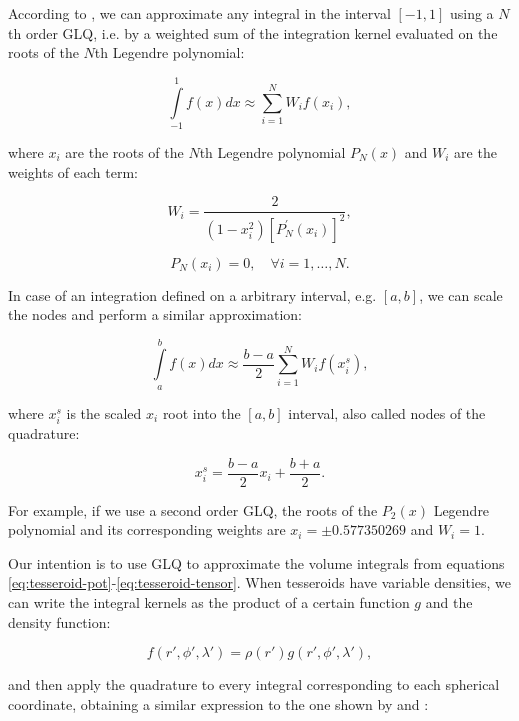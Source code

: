 \documentclass[extra]{gji}
\begin{document}
According to \citet[p.~390]{Hildebrand1987}, we can approximate any 
integral in the interval $[-1, 1]$ using a $N$th order GLQ, i.e. by a 
weighted sum of the integration kernel evaluated on the roots of the 
$N$th Legendre polynomial:

\begin{equation}
    \int\limits_{-1}^1 f(x) dx \approx \sum_{i=1}^N W_i f(x_i),
\end{equation}

\noindent where $x_i$ are the roots of the $N$th Legendre polynomial 
$P_N(x)$ and $W_i$ are the weights of each term:

\begin{equation}
    W_i = \frac{2}{(1-x_i^2)[P_N^\prime(x_i)]^2},
\end{equation}

\begin{equation}
    P_N(x_i) = 0, \quad \forall i = {1,\dots,N}.
\end{equation}

In case of an integration defined on a arbitrary interval, e.g. 
$[a,b]$, we can scale the nodes and perform a similar approximation:

\begin{equation}
    \int\limits_a^b f(x) dx \approx \frac{b-a}{2} \sum_{i=1}^N W_i f(x_i^s),
\label{eq:glq-scaled}
\end{equation}

\noindent where $x_i^s$ is the scaled $x_i$ root into the $[a,b]$ 
interval, also called nodes of the quadrature:

\begin{equation}
    x_i^s = \frac{b-a}{2} x_i + \frac{b+a}{2}.
\end{equation}

\noindent For example, if we use a second order GLQ, the roots of the 
$P_2(x)$ Legendre polynomial and its corresponding weights are $x_i = 
\pm 0.577350269$ and $W_i = 1$.

Our intention is to use GLQ to approximate the volume integrals from 
equations \ref{eq:tesseroid-pot}-\ref{eq:tesseroid-tensor}.
When tesseroids have variable densities, we can write the integral 
kernels as the product of a certain function $g$ and the density 
function:

\begin{equation}
    f(r', \phi', \lambda') = \rho(r') g(r', \phi', \lambda'),
\end{equation}

\noindent and then apply the quadrature to every integral corresponding 
to each spherical coordinate, obtaining a similar expression to the one 
shown by \citet{Asgharzadeh2007} and \citet{Uieda2016}:
\end{document}
